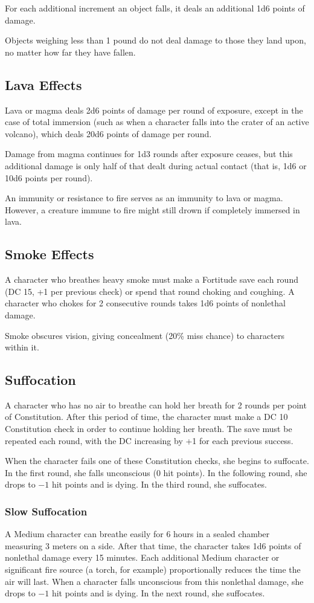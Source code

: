 For each additional increment an object falls, it deals an additional 1d6 points of damage.

Objects weighing less than 1 pound do not deal damage to those they land upon, no matter how far they have fallen.


\subsection{Lava Effects}
Lava or magma deals 2d6 points of damage per round of exposure, except in the case of total immersion (such as when a character falls into the crater of an active volcano), which deals 20d6 points of damage per round.

Damage from magma continues for 1d3 rounds after exposure ceases, but this additional damage is only half of that dealt during actual contact (that is, 1d6 or 10d6 points per round).

An immunity or resistance to fire serves as an immunity to lava or magma. However, a creature immune to fire might still drown if completely immersed in lava.


\subsection{Smoke Effects}
A character who breathes heavy smoke must make a Fortitude save each round (DC 15, +1 per previous check) or spend that round choking and coughing. A character who chokes for 2 consecutive rounds takes 1d6 points of nonlethal damage.

Smoke obscures vision, giving concealment (20\% miss chance) to characters within it.


\subsection{Suffocation}
A character who has no air to breathe can hold her breath for 2 rounds per point of Constitution. After this period of time, the character must make a DC 10 Constitution check in order to continue holding her breath. The save must be repeated each round, with the DC increasing by +1 for each previous success.

When the character fails one of these Constitution checks, she begins to suffocate. In the first round, she falls unconscious (0 hit points). In the following round, she drops to $-1$ hit points and is dying. In the third round, she suffocates.

\subsubsection{Slow Suffocation}
A Medium character can breathe easily for 6 hours in a sealed chamber measuring 3 meters on a side. After that time, the character takes 1d6 points of nonlethal damage every 15 minutes. Each additional Medium character or significant fire source (a torch, for example) proportionally reduces the time the air will last. When a character falls unconscious from this nonlethal damage, she drops to $-1$ hit points and is dying. In the next round, she suffocates.

